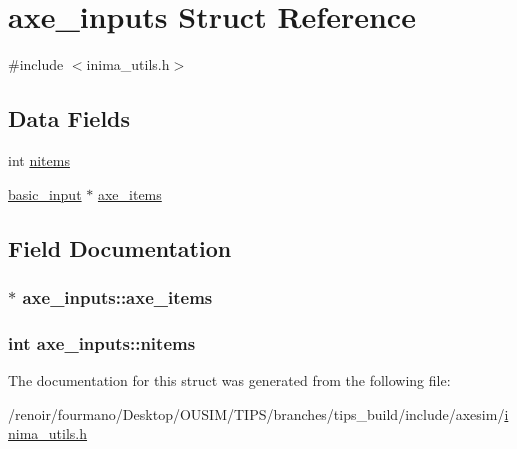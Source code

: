 \hypertarget{structaxe__inputs}{
\section{axe\_\-inputs Struct Reference}
\label{structaxe__inputs}
}


{\ttfamily \#include $<$inima\_\-utils.h$>$}\subsection*{Data Fields}
\begin{DoxyCompactItemize}
\item 
int \hyperlink{structaxe__inputs_a0cd390c5a8f9bb931dffdfee8f646e19}{nitems}
\item 
\hyperlink{structbasic__input}{basic\_\-input} $\ast$ \hyperlink{structaxe__inputs_a037661a38868809f953a4a2e47140b88}{axe\_\-items}
\end{DoxyCompactItemize}


\subsection{Field Documentation}
\hypertarget{structaxe__inputs_a037661a38868809f953a4a2e47140b88}{
\subsubsection[{axe\_\-items}]{$\ast$ {\bf axe\_\-inputs::axe\_\-items}}}
\label{structaxe__inputs_a037661a38868809f953a4a2e47140b88}
\hypertarget{structaxe__inputs_a0cd390c5a8f9bb931dffdfee8f646e19}{
\subsubsection[{nitems}]{\setlength{\rightskip}{0pt plus 5cm}int {\bf axe\_\-inputs::nitems}}}
\label{structaxe__inputs_a0cd390c5a8f9bb931dffdfee8f646e19}


The documentation for this struct was generated from the following file:\begin{DoxyCompactItemize}
\item 
/renoir/fourmano/Desktop/OUSIM/TIPS/branches/tips\_\-build/include/axesim/\hyperlink{inima__utils_8h}{inima\_\-utils.h}\end{DoxyCompactItemize}
